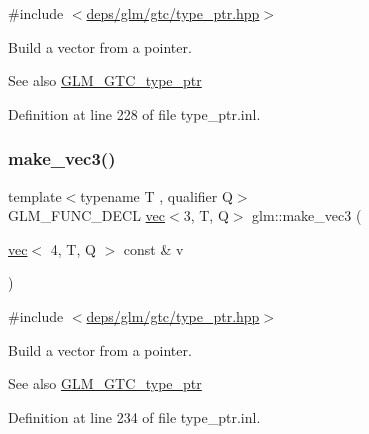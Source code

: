 {\ttfamily \#include $<$\hyperlink{type__ptr_8hpp}{deps/glm/gtc/type\+\_\+ptr.\+hpp}$>$}

Build a vector from a pointer. \begin{DoxySeeAlso}{See also}
\hyperlink{group__gtc__type__ptr}{G\+L\+M\+\_\+\+G\+T\+C\+\_\+type\+\_\+ptr} 
\end{DoxySeeAlso}


Definition at line 228 of file type\+\_\+ptr.\+inl.

\mbox{\label{group__gtc__type__ptr_ga8b589ed7d41a298b516d2a69169248f1}} 
\subsubsection{\texorpdfstring{make\+\_\+vec3()}{make\_vec3()}\hspace{0.1cm}{\footnotesize\ttfamily [4/5]}}
{\footnotesize\ttfamily template$<$typename T , qualifier Q$>$ \\
G\+L\+M\+\_\+\+F\+U\+N\+C\+\_\+\+D\+E\+CL \hyperlink{structglm_1_1vec}{vec}$<$3, T, Q$>$ glm\+::make\+\_\+vec3 (\begin{DoxyParamCaption}\item[{\hyperlink{structglm_1_1vec}{vec}$<$ 4, T, Q $>$ const \&}]{v }\end{DoxyParamCaption})\hspace{0.3cm}{\ttfamily [inline]}}



{\ttfamily \#include $<$\hyperlink{type__ptr_8hpp}{deps/glm/gtc/type\+\_\+ptr.\+hpp}$>$}

Build a vector from a pointer. \begin{DoxySeeAlso}{See also}
\hyperlink{group__gtc__type__ptr}{G\+L\+M\+\_\+\+G\+T\+C\+\_\+type\+\_\+ptr} 
\end{DoxySeeAlso}


Definition at line 234 of file type\+\_\+ptr.\+inl.

\mbox{\label{group__gtc__type__ptr_gad9e0d36ff489cb30c65ad1fa40351651}} 
